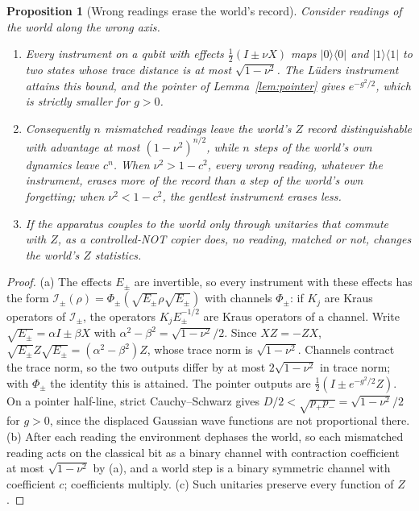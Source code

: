 \documentclass[11pt,a4paper]{article}
\newtheorem{proposition}[definition]{Proposition}
\begin{document}
\begin{proposition}[Wrong readings erase the world's record]\label{prop:disturb}
Consider readings of the world along the wrong axis.
\begin{enumerate}
\item[(a)] Every instrument on a qubit with effects $\frac12(I\pm\nu X)$ maps $|0\rangle\langle0|$ and $|1\rangle\langle1|$ to two states whose trace distance is at most $\sqrt{1-\nu^2}$. The L\"uders instrument attains this bound, and the pointer of Lemma~\ref{lem:pointer} gives $e^{-g^2/2}$, which is strictly smaller for $g>0$.
\item[(b)] Consequently $n$ mismatched readings leave the world's $Z$ record distinguishable with advantage at most $(1-\nu^2)^{n/2}$, while $n$ steps of the world's own dynamics leave $c^n$. When $\nu^2>1-c^2$, every wrong reading, whatever the instrument, erases more of the record than a step of the world's own forgetting; when $\nu^2<1-c^2$, the gentlest instrument erases less.
\item[(c)] If the apparatus couples to the world only through unitaries that commute with $Z$, as a controlled-NOT copier does, no reading, matched or not, changes the world's $Z$ statistics.
\end{enumerate}
\end{proposition}
\begin{proof}
(a) The effects $E_\pm$ are invertible, so every instrument with these effects has the form $\mathcal I_\pm(\rho)=\Phi_\pm(\sqrt{E_\pm}\rho\sqrt{E_\pm})$ with channels $\Phi_\pm$: if $K_j$ are Kraus operators of $\mathcal I_\pm$, the operators $K_jE_\pm^{-1/2}$ are Kraus operators of a channel. Write $\sqrt{E_\pm}=\alpha I\pm\beta X$ with $\alpha^2-\beta^2=\sqrt{1-\nu^2}/2$. Since $XZ=-ZX$, $\sqrt{E_\pm}Z\sqrt{E_\pm}=(\alpha^2-\beta^2)Z$, whose trace norm is $\sqrt{1-\nu^2}$. Channels contract the trace norm, so the two outputs differ by at most $2\sqrt{1-\nu^2}$ in trace norm; with $\Phi_\pm$ the identity this is attained. The pointer outputs are $\frac12(I\pm e^{-g^2/2}Z)$. On a pointer half-line, strict Cauchy--Schwarz gives $D/2<\sqrt{p_+p_-}=\sqrt{1-\nu^2}/2$ for $g>0$, since the displaced Gaussian wave functions are not proportional there.
(b) After each reading the environment dephases the world, so each mismatched reading acts on the classical bit as a binary channel with contraction coefficient at most $\sqrt{1-\nu^2}$ by (a), and a world step is a binary symmetric channel with coefficient $c$; coefficients multiply.
(c) Such unitaries preserve every function of $Z$.
\end{proof}
\end{document}
